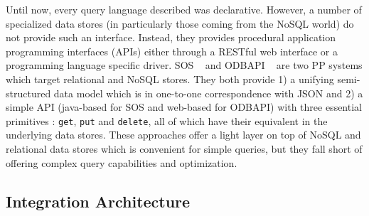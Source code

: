 Until now, every query language described was declarative. However, a number of specialized data stores (in particularly those coming from the NoSQL world) do not provide such an interface. Instead, they provides procedural application programming interfaces (APIs) either through a RESTful web interface or a programming language specific driver. SOS ~\cite{Atzeni2012} and ODBAPI ~\cite{Sellami2014} are two PP systems which target relational and NoSQL stores. They both provide 1) a unifying semi-structured data model which is in one-to-one correspondence with JSON and 2) a simple API (java-based for SOS and web-based for ODBAPI) with three essential primitives : \texttt{get}, \texttt{put} and \texttt{delete}, all of which have their equivalent in the underlying data stores. These approaches offer a light layer on top of NoSQL and relational data stores which is convenient for simple queries, but they fall short of offering complex query capabilities and optimization. 
















\subsection{Integration Architecture}

